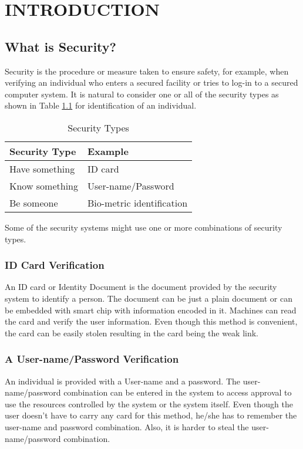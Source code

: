 \chapter{INTRODUCTION}
\label{chap-one}
\section{What is Security?}
	Security is the procedure or measure taken to ensure safety, for example, when verifying an individual who enters a secured facility or tries to log-in to a secured computer system. It is natural to consider one or all of the security types as shown in Table \ref{Table:Security_types} for identification of an individual.
    
    	\begin{table}[h!]
		\centering
		\caption{Security Types}
		\label{Table:Security_types}
		\begin{tabular}{l l}
			\hline
			Security Type &Example\\\hline
			Have something&ID card\\
			Know something&User-name/Password\\
			Be someone&Bio-metric identification\\
		\end{tabular}
	\end{table}
    Some of the security systems might use one or more combinations of security types.
    
\subsection{ID Card Verification}
    An ID card or Identity Document is the document provided by the security system to identify a person. The document can be just a plain document or can be embedded with smart chip with information encoded in it. Machines can read the card and verify the user information. Even though this method is convenient, the card can be easily stolen resulting in the card being the weak link.

\subsection{A User-name/Password Verification}
	An individual is provided with a User-name and a password. The user-name/password combination can be entered in the system to access approval to use the resources controlled by the system or the system itself. Even though the user doesn't have to carry any card for this method, he/she has to remember the user-name and password combination. Also, it is harder to steal the user-name/password combination.
    
